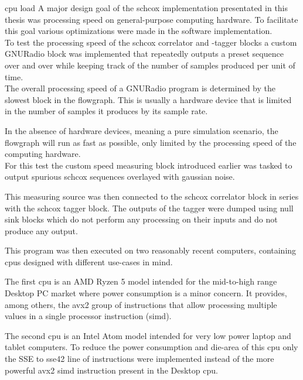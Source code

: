 \begin{subchapter}{\Acrshort{cpu} load}
  A major design goal of the \gls{schcox} implementation
  presentated in this thesis was processing speed on
  general-purpose computing hardware.
  To facilitate this goal various optimizations were
  made in the software implementation. \\

  To test the processing speed of the
  \gls{schcox} correlator and -tagger blocks
  a custom GNURadio block was implemented that repeatedly outputs
  a preset sequence over and over while keeping
  track of the number of samples produced per unit of time. \\

  The overall processing speed of a GNURadio program
  is determined by the slowest block in the flowgraph.
  This is usually a hardware device that is limited in
  the number of samples it produces by its sample rate.

  In the absence of hardware devices, meaning a pure
  simulation scenario, the flowgraph will run as fast
  as possible, only limited by the processing speed
  of the computing hardware. \\

  For this test the custom speed measuring block
  introduced earlier was tasked to output spurious
  \gls{schcox} sequences overlayed with gaussian noise.

  This measuring source was then connected to the
  \gls{schcox} correlator block in series with
  the \gls{schcox} tagger block.
  The outputs of the tagger were dumped using
  null sink blocks which do not perform any processing
  on their inputs and do not produce any output.

  This program was then executed on two reasonably
  recent computers, containing \glspl{cpu} designed
  with different use-cases in mind.

  The first \gls{cpu} is an AMD Ryzen 5 model intended
  for the mid-to-high range Desktop PC market where power
  consumption is a minor concern.
  It provides, among others, the \acrshort{avx2} group of instructions
  that allow processing multiple values in a single processor
  instruction (\acrshort{simd}).

  The second \gls{cpu} is an Intel Atom model intended
  for very low power laptop and tablet computers.
  To reduce the power consumption and die-area
  of this \gls{cpu} only the SSE to \acrshort{sse42} line of
  instructions were implemented instead of the
  more powerful \acrshort{avx2} \acrshort{simd} instruction present
  in the Desktop \gls{cpu}. \\


\end{subchapter}
